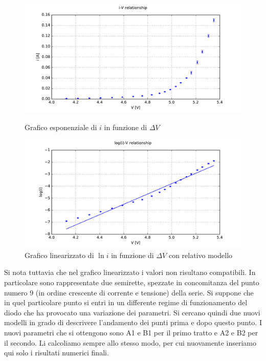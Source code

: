 \begin{figure}
    \centering
    \begin{minipage}{0.49\textwidth}
        \centering
        \includegraphics[width=\textwidth]{fig1Z.pdf} 
        \caption{Grafico esponenziale di $i$ in funzione di $\Delta V$}
        \label{fig:gZe}
    \end{minipage}\hfill
    \begin{minipage}{0.49\textwidth}
        \centering
        \includegraphics[width=\textwidth]{fig2Z.pdf} 
        \caption{Grafico linearizzato di $\ln{i}$ in funzione di $\Delta V$ con relativo modello}
        \label{fig:gZl}
    \end{minipage}
\end{figure}

Si nota tuttavia che nel grafico linearizzato i valori non risultano compatibili. In particolare sono rappresentate due semirette, spezzate in concomitanza del punto numero 9 (in ordine crescente di corrente e tensione) della serie. Si suppone che in quel particolare punto si entri in un differente regime di funzionamento del diodo che ha provocato una variazione dei parametri. Si cercano quindi due nuovi modelli in grado di descrivere l'andamento dei punti prima e dopo questo punto. I nuovi parametri che si ottengono sono A1 e B1 per il primo tratto e A2 e B2 per il secondo. Li calcoliamo sempre allo stesso modo, per cui nuovamente inseriamo qui solo i risultati numerici finali.

